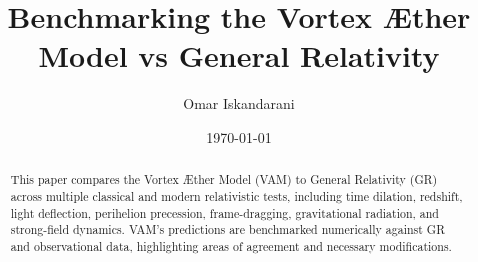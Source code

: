 \documentclass{article}
\author{Omar Iskandarani}
\title{Benchmarking the Vortex Æther Model vs General Relativity}
\date{\today}
\affiliation{Independent Researcher, Groningen, The Netherlands}
\begin{document}
\begin{abstract}
This paper compares the Vortex Æther Model (VAM) to General Relativity (GR) across multiple classical and modern relativistic tests, including time dilation, redshift, light deflection, perihelion precession, frame-dragging, gravitational radiation, and strong-field dynamics. VAM’s predictions are benchmarked numerically against GR and observational data, highlighting areas of agreement and necessary modifications.
\end{abstract}

\maketitle
























\end{document}

